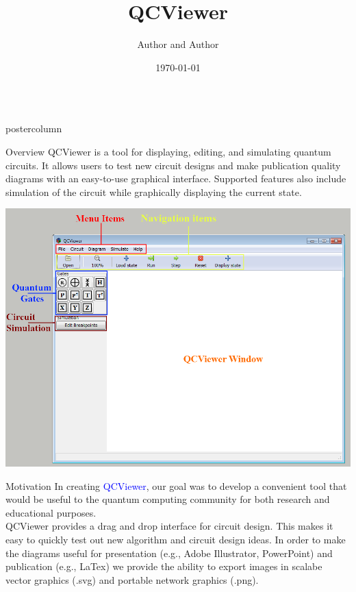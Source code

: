 \documentclass[final]{beamer} %
\title[QCViewer]{QCViewer}
\author[Author]{Author and Author}
\institute[IQC, University of Waterloo]{Quantum Circuits group, IQC, University of Waterloo}
\date{\today}
\begin{document}
  \begin{frame}{} 
  \begin{columns}
   
    \begin{column}{.33\textwidth}
      \begin{beamercolorbox}[center,wd=\textwidth]{postercolumn}
         \begin{minipage}[T]{.95\textwidth}
           \begin{block}{\large Overview}
	QCViewer is a tool for displaying, editing, and simulating quantum circuits. It allows users to test new circuit designs and make publication quality diagrams with an easy-to-use graphical interface. Supported features also include simulation of the circuit while graphically displaying the current state. 

             \centering 
             \includegraphics{figures/QCViewerGUI.png}
           \end{block}

           \begin{block}{\large Motivation}
             In creating \textcolor{blue}{QCViewer}, our goal was to develop a convenient tool that would be useful to 
             the quantum computing community for both research and educational purposes. 
	\newline
	\\
             QCViewer provides a drag and drop interface for circuit design. This makes it easy to quickly 
             test out new algorithm and circuit design ideas. In order to make the diagrams useful for presentation 
             (e.g., Adobe Illustrator, PowerPoint) and publication (e.g., LaTex) we provide the ability to export 
             images in scalabe vector graphics (.svg) and portable network graphics (.png).


\end{block}
\end{minipage}
\end{beamercolorbox}
\end{column}
\end{columns}
\end{frame}
\end{document}
